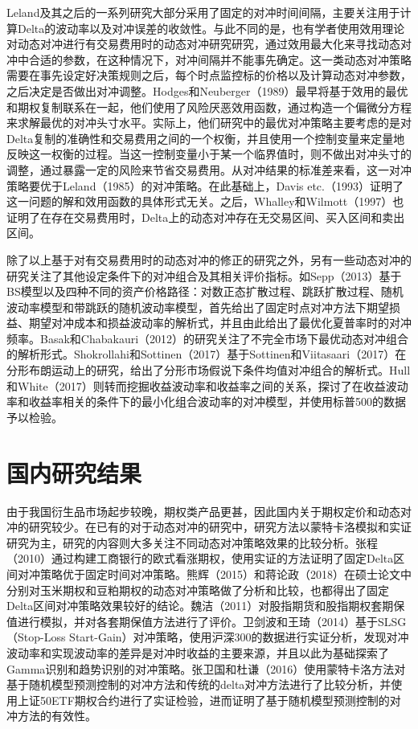 Leland及其之后的一系列研究大部分采用了固定的对冲时间间隔，主要关注用于计算Delta的波动率以及对冲误差的收敛性。与此不同的是，也有学者使用效用理论对动态对冲进行有交易费用时的动态对冲研究研究，通过效用最大化来寻找动态对冲中合适的参数，在这种情况下，对冲间隔并不能事先确定。这一类动态对冲策略需要在事先设定好决策规则之后，每个时点监控标的价格以及计算动态对冲参数，之后决定是否做出对冲调整。Hodges和Neuberger（1989）\cite{hodges1989optimal}最早将基于效用的最优和期权复制联系在一起，他们使用了风险厌恶效用函数，通过构造一个偏微分方程来求解最优的对冲头寸水平。实际上，他们研究中的最优对冲策略主要考虑的是对Delta复制的准确性和交易费用之间的一个权衡，并且使用一个控制变量来定量地反映这一权衡的过程。当这一控制变量小于某一个临界值时，则不做出对冲头寸的调整，通过暴露一定的风险来节省交易费用。从对冲结果的标准差来看，这一对冲策略要优于Leland（1985）\cite{leland1985option}的对冲策略。在此基础上，Davis etc.（1993）\cite{davis1993european}证明了这一问题的解和效用函数的具体形式无关。之后，Whalley和Wilmott（1997）\cite{whalley1997asymptotic}也证明了在存在交易费用时，Delta上的动态对冲存在无交易区间、买入区间和卖出区间。

除了以上基于对有交易费用时的动态对冲的修正的研究之外，另有一些动态对冲的研究关注了其他设定条件下的对冲组合及其相关评价指标。如Sepp（2013）\cite{sepp2013you}基于BS模型以及四种不同的资产价格路径：对数正态扩散过程、跳跃扩散过程、随机波动率模型和带跳跃的随机波动率模型，首先给出了固定时点对冲方法下期望损益、期望对冲成本和损益波动率的解析式，并且由此给出了最优化夏普率时的对冲频率。Basak和Chabakauri（2012）\cite{basak2012dynamic}的研究关注了不完全市场下最优动态对冲组合的解析形式。Shokrollahi和Sottinen（2017）\cite{shokrollahi2017hedging}基于Sottinen和Viitasaari（2017）\cite{sottinen2017prediction}在分形布朗运动上的研究，给出了分形市场假说下条件均值对冲组合的解析式。Hull和White（2017）\cite{hull2017optimal}则转而挖掘收益波动率和收益率之间的关系，探讨了在收益波动率和收益率相关的条件下的最小化组合波动率的对冲模型，并使用标普500的数据予以检验。

\section{国内研究结果}

由于我国衍生品市场起步较晚，期权类产品更甚，因此国内关于期权定价和动态对冲的研究较少。在已有的对于动态对冲的研究中，研究方法以蒙特卡洛模拟和实证研究为主，研究的内容则大多关注不同动态对冲策略效果的比较分析。张程（2010）\cite{zc2010}通过构建工商银行的欧式看涨期权，使用实证的方法证明了固定Delta区间对冲策略优于固定时间对冲策略。熊辉（2015）\cite{xh2015}和蒋论政（2018）\cite{jlz2018}在硕士论文中分别对玉米期权和豆粕期权的动态对冲策略做了分析和比较，也都得出了固定Delta区间对冲策略效果较好的结论。魏洁（2011）\cite{wj2011}对股指期货和股指期权套期保值进行模拟，并对各套期保值方法进行了评价。卫剑波和王琦（2014）\cite{wjb2014}基于SLSG（Stop-Loss Start-Gain）对冲策略，使用沪深300的数据进行实证分析，发现对冲波动率和实现波动率的差异是对冲时收益的主要来源，并且以此为基础探索了Gamma识别和趋势识别的对冲策略。张卫国和杜谦（2016）\cite{zwg2016}使用蒙特卡洛方法对基于随机模型预测控制的对冲方法和传统的delta对冲方法进行了比较分析，并使用上证50ETF期权合约进行了实证检验，进而证明了基于随机模型预测控制的对冲方法的有效性。

